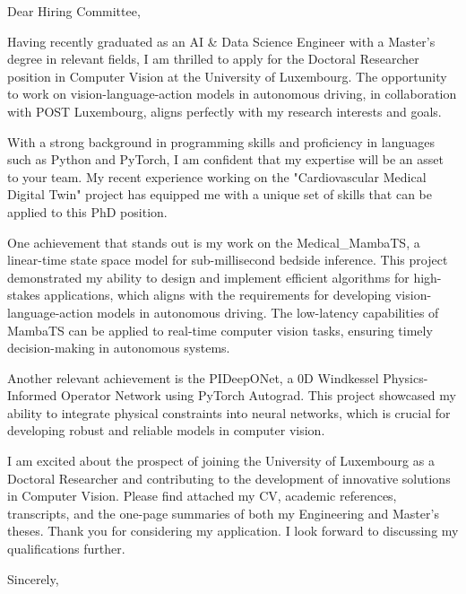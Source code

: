 \documentclass{letter}
\begin{document}
\begin{letter}{}

\address{\thinspace University of Luxembourg, Luxembourg City, Luxembourg}

\signature{Ismail Aissaoui}

\opening{Dear Hiring Committee,}

Having recently graduated as an AI \& Data Science Engineer with a Master's degree in relevant fields, I am thrilled to apply for the Doctoral Researcher position in Computer Vision at the University of Luxembourg. The opportunity to work on vision-language-action models in autonomous driving, in collaboration with POST Luxembourg, aligns perfectly with my research interests and goals.

With a strong background in programming skills and proficiency in languages such as Python and PyTorch, I am confident that my expertise will be an asset to your team. My recent experience working on the "Cardiovascular Medical Digital Twin" project has equipped me with a unique set of skills that can be applied to this PhD position.

One achievement that stands out is my work on the Medical\_MambaTS, a linear-time state space model for sub-millisecond bedside inference. This project demonstrated my ability to design and implement efficient algorithms for high-stakes applications, which aligns with the requirements for developing vision-language-action models in autonomous driving. The low-latency capabilities of MambaTS can be applied to real-time computer vision tasks, ensuring timely decision-making in autonomous systems.

Another relevant achievement is the PI\-DeepONet, a 0D Windkessel Physics-Informed Operator Network using PyTorch Autograd. This project showcased my ability to integrate physical constraints into neural networks, which is crucial for developing robust and reliable models in computer vision.

I am excited about the prospect of joining the University of Luxembourg as a Doctoral Researcher and contributing to the development of innovative solutions in Computer Vision. Please find attached my CV, academic references, transcripts, and the one-page summaries of both my Engineering and Master's theses. Thank you for considering my application. I look forward to discussing my qualifications further.

\closing{Sincerely,}

\end{letter}
\end{document}
